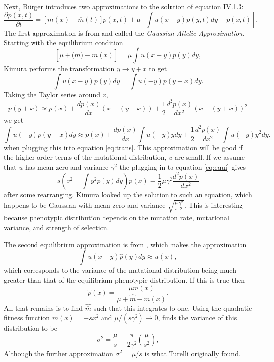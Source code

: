 Next, B{\"u}rger introduces two approximations to the solution of equation IV.1.3:
\begin{equation} \label{eq:1.3}
\frac{\partial p(x,t)}{\partial t} = \left[ m(x) - \overline{m}(t) \right]p(x,t) + \mu \left[ \int u(x-y)p(y,t)dy -p(x,t)\right].
\end{equation}
The first approximation is from \citet{Kimura1965} and called the \emph{Gaussian Allelic Approximation}. Starting with
the equilibrium condition
\begin{equation} \label{eq:equi}
\left[ \mu + \overline(m) - m(x) \right] = \mu \int u(x-y) p(y)dy, 
\end{equation}
Kimura performs the transformation $y \to y + x$ to get
\begin{equation} \label{eq:trans}
\int u(x-y) p(y) dy = \int u(-y)p(y+x)dy.
\end{equation}
Taking the Taylor series around $x$, 
\begin{equation}
p(y+x) \approx p(x) + \frac{dp(x)}{dx}\left( x-(y+x) \right) + \frac{1}{2} \frac{d^2p(x)}{dx^2}\left( x-(y+x) \right)^2
\end{equation}
we get
\begin{equation}
\int u(-y)p(y+x)dy \approx p(x) + \frac{dp(x)}{dx} \int u(-y)y dy + \frac{1}{2} \frac{d^2p(x)}{dx^2}\int u(-y)y^2dy.
\end{equation}
when plugging this into equation \ref{eq:trans}. This approximation will be good if the higher order terms of the
mutational distribution, $u$ are small. If we assume that $u$ has mean zero and variance $\gamma^2$ the plugging in to 
equation \ref{eq:equi} gives
\begin{equation}
s\left( x^2 - \int y^2p(y)dy\right)p(x) = \frac{1}{2}\mu\gamma^2\frac{d^2p(x)}{dx^2}
\end{equation}
after some rearranging. Kimura looked up the solution to such an equation, which happens to be Gaussian with mean zero
and variance $\sqrt{\frac{\mu}{s}\frac{\gamma^2}{2}}$. This is interesting because phenotypic distribution depends on
the mutation rate, mutational variance, and strength of selection.

The second equilibrium approximation is from \citet{Turelli1984}, which makes the approximation 
\begin{equation}
\int u(x-y)\hat{p}(y)dy \approx u(x), 
\end{equation}
which corresponds to the variance of the mutational distribution being much greater than that of the equilibrium
phenotypic distribution. If this is true then 
\begin{equation}
\hat{p}(x) = \frac{\mu m(x)}{\mu + \hat{\overline{m}} - m(x)}.
\end{equation}
All that remains is to find $\hat{\overline{m}}$ such that this integrates to one. Using the quadratic fitness function
$m(x)=-sx^2$ and $\mu/(s\gamma^2) \to 0$, \citet{burger2000mathematical} finds the variance of this distribution to be
\begin{equation}
\sigma^2 = \frac{\mu}{s} - \frac{\pi}{2\gamma^2}\left( \frac{\mu}{s^2}\right), 
\end{equation}
Although the further approximation $\sigma^2=\mu/s$ is what Turelli originally found.

